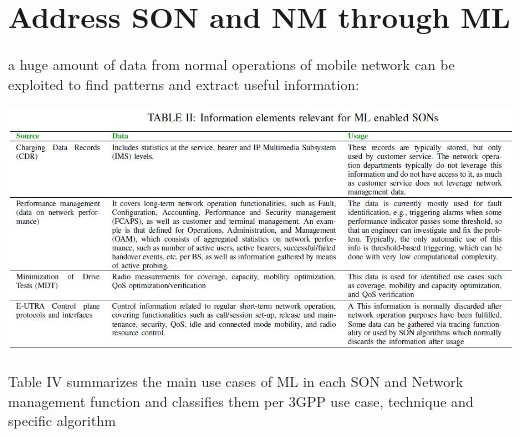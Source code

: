 \documentclass[12pt]{article}
\begin{document}
\section{Address SON and NM through ML}
a huge amount of data from normal
operations of mobile network can be exploited to find patterns and extract useful
information:


\includegraphics[width=1\textwidth]{table2.jpg}

\noindent Table IV
summarizes the main use cases of ML in each SON and Network management function and classifies them
per 3GPP use case, technique and specific algorithm
\end{document}
